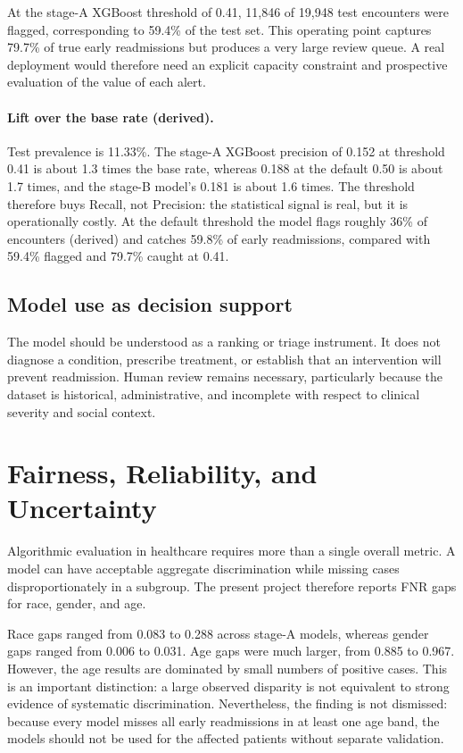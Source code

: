 \documentclass[10pt,a4paper]{article}
\begin{document}
At the stage-A XGBoost threshold of 0.41, 11,846 of 19,948 test encounters were flagged, corresponding to 59.4\% of the test set. This operating point captures 79.7\% of true early readmissions but produces a very large review queue. A real deployment would therefore need an explicit capacity constraint and prospective evaluation of the value of each alert.

\paragraph{Lift over the base rate (derived).} Test prevalence is 11.33\%. The stage-A XGBoost precision of 0.152 at threshold 0.41 is about 1.3 times the base rate, whereas 0.188 at the default 0.50 is about 1.7 times, and the stage-B model's 0.181 is about 1.6 times. The threshold therefore buys Recall, not Precision: the statistical signal is real, but it is operationally costly. At the default threshold the model flags roughly 36\% of encounters (derived) and catches 59.8\% of early readmissions, compared with 59.4\% flagged and 79.7\% caught at 0.41.

\subsection{Model use as decision support}

The model should be understood as a ranking or triage instrument. It does not diagnose a condition, prescribe treatment, or establish that an intervention will prevent readmission. Human review remains necessary, particularly because the dataset is historical, administrative, and incomplete with respect to clinical severity and social context.

\section{Fairness, Reliability, and Uncertainty}

Algorithmic evaluation in healthcare requires more than a single overall metric. A model can have acceptable aggregate discrimination while missing cases disproportionately in a subgroup. The present project therefore reports FNR gaps for race, gender, and age.

Race gaps ranged from 0.083 to 0.288 across stage-A models, whereas gender gaps ranged from 0.006 to 0.031. Age gaps were much larger, from 0.885 to 0.967. However, the age results are dominated by small numbers of positive cases. This is an important distinction: a large observed disparity is not equivalent to strong evidence of systematic discrimination. Nevertheless, the finding is not dismissed: because every model misses all early readmissions in at least one age band, the models should not be used for the affected patients without separate validation.
\end{document}
